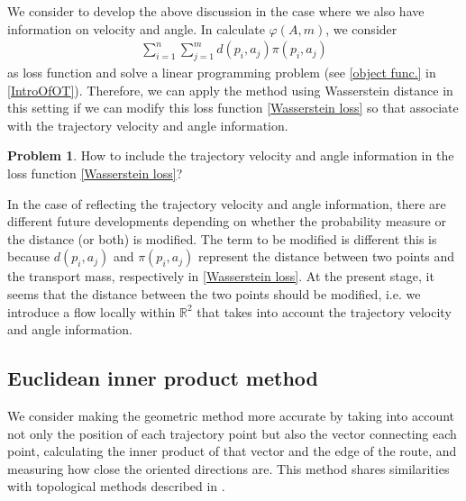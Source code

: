 \documentclass{article}
\numberwithin{equation}{section}
\theoremstyle{definition}
\newtheorem{prob}[prob]{Problem}
\newcommand{\R}{\mathbb{R}}
\begin{document}
We consider to develop the above discussion in the case where we also have information on velocity and angle.
In calculate $\varphi(A,m)$, we consider 
\begin{align}
    \sum_{i=1}^n \sum_{j=1}^m d(p_i,a_j)\pi(p_i,a_j) \label{Wasserstein loss}
\end{align}
as loss function and solve a linear programming problem (see \eqref{object func.} in \autoref{IntroOfOT}).
Therefore, we can apply the method using Wasserstein distance in this setting if we can modify this loss function \eqref{Wasserstein loss} so that associate with the trajectory velocity and angle information.

\begin{prob}
How to include the trajectory velocity and angle information in the loss function \eqref{Wasserstein loss}?
\end{prob}

In the case of reflecting the trajectory velocity and angle information, there are different future developments depending on whether the probability measure or the distance (or both) is modified.
The term to be modified is different this is because $d(p_i,a_j)$ and $\pi(p_i,a_j)$ represent the distance between two points and the transport mass, respectively in \eqref{Wasserstein loss}.
At the present stage, it seems that the distance between the two points should be modified, i.e. we introduce a flow locally within $\R^2$ that takes into account the trajectory velocity and angle information.


\subsection{Euclidean inner product method}

We consider making the geometric method more accurate by taking into account not only the position of each trajectory point but also the vector connecting each point, calculating the inner product of that vector and the edge of the route, and measuring how close the oriented directions are. This method shares similarities with topological methods described in \cite{QOZN}.
\end{document}
